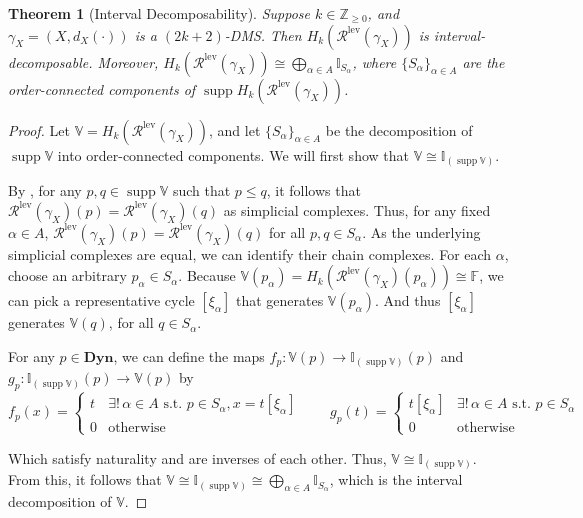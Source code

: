 \documentclass[10pt,a4paper]{amsart}
\newtheorem{theorem}{Theorem}
\def\bbv{\mathbb{V}}
\def\bdyn{\mathbf{Dyn}}
\DeclareMathOperator{\supp}{supp}
\begin{document}
    \begin{theorem}[Interval Decomposability] \label{thm:intervaldecomp}
        Suppose $k \in \mathbb{Z}_{\geq 0}$, and $\gamma_X = (X, d_X(\cdot))$ is a $(2k+2)$-DMS. Then $H_k(\mathcal{R}^{\mathrm{lev}}(\gamma_X))$ is interval-decomposable. Moreover, $H_k(\mathcal{R}^{\mathrm{lev}}(\gamma_X)) \cong \bigoplus_{\alpha \in A} \mathbb{I}_{S_\alpha}$, where $\{S_\alpha\}_{\alpha \in A}$ are the order-connected components of $\supp H_k(\mathcal{R}^{\mathrm{lev}}(\gamma_X))$.
    \end{theorem}

    \begin{proof}
        Let $\bbv = H_k(\mathcal{R}^{\mathrm{lev}}(\gamma_X))$, and let $\{S_\alpha\}_{\alpha \in A}$ be the decomposition of $\supp \bbv$ into order-connected components. We will first show that $\bbv \cong \mathbb{I}_{(\supp \bbv)}$.

        By , for any $p, q \in \supp \bbv$ such that $p \leq q$, it follows that $\mathcal{R}^{\mathrm{lev}}(\gamma_X)(p) = \mathcal{R}^{\mathrm{lev}}(\gamma_X)(q)$ as simplicial complexes. Thus, for any fixed $\alpha \in A$, $\mathcal{R}^{\mathrm{lev}}(\gamma_X)(p) = \mathcal{R}^{\mathrm{lev}}(\gamma_X)(q)$ for all $p, q \in S_\alpha$. As the underlying simplicial complexes are equal, we can identify their chain complexes. For each $\alpha$, choose an arbitrary $p_\alpha \in S_\alpha$. Because $\bbv(p_\alpha) = H_k(\mathcal{R}^{\mathrm{lev}}(\gamma_X)(p_\alpha)) \cong \mathbb{F}$, we can pick a representative cycle $[\xi_\alpha]$ that generates $\bbv(p_\alpha)$. And thus $[\xi_\alpha]$ generates $\bbv(q)$, for all $q \in S_\alpha$.

        For any $p \in \bdyn$, we can define the maps $f_p: \bbv(p) \rightarrow \mathbb{I}_{(\supp \bbv)}(p)$ and $g_p: \mathbb{I}_{(\supp \bbv)}(p) \rightarrow \bbv(p)$ by
        \[
            f_p(x) = 
            \begin{cases}
                t & \exists!\, \alpha \in A \text{ s.t. } p \in S_\alpha, x = t [\xi_\alpha] \\
                0 & \text{otherwise}
            \end{cases}
            \qquad
            g_p(t) = 
            \begin{cases}
                t[\xi_\alpha] & \exists! \, \alpha \in A \text{ s.t. } p \in S_\alpha \\
                0 & \text{otherwise}
            \end{cases}
        \]

        Which satisfy naturality and are inverses of each other. Thus, $\bbv \cong \mathbb{I}_{(\supp \bbv)}$. From this, it follows that $\bbv \cong \mathbb{I}_{(\supp \bbv)} \cong \bigoplus_{\alpha \in A} \mathbb{I}_{S_\alpha}$, which is the interval decomposition of $\bbv$.
    \end{proof}
\end{document}
